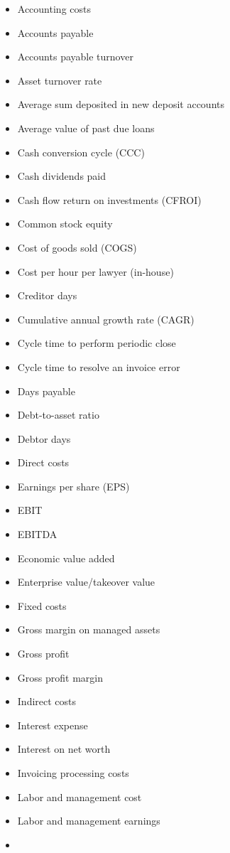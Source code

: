 \documentclass[]{book}
\providecommand{\tightlist}{%
  \setlength{\itemsep}{0pt}\setlength{\parskip}{0pt}}
\begin{document}
\begin{itemize}
\tightlist
\item
  Accounting costs
\item
  Accounts payable
\item
  Accounts payable turnover
\item
  Asset turnover rate
\item
  Average sum deposited in new deposit accounts
\item
  Average value of past due loans
\item
  Cash conversion cycle (CCC)
\item
  Cash dividends paid
\item
  Cash flow return on investments (CFROI)
\item
  Common stock equity
\item
  Cost of goods sold (COGS)
\item
  Cost per hour per lawyer (in-house)
\item
  Creditor days
\item
  Cumulative annual growth rate (CAGR)
\item
  Cycle time to perform periodic close
\item
  Cycle time to resolve an invoice error
\item
  Days payable
\item
  Debt-to-asset ratio
\item
  Debtor days
\item
  Direct costs
\item
  Earnings per share (EPS)
\item
  EBIT
\item
  EBITDA
\item
  Economic value added
\item
  Enterprise value/takeover value
\item
  Fixed costs
\item
  Gross margin on managed assets
\item
  Gross profit
\item
  Gross profit margin
\item
  Indirect costs
\item
  Interest expense
\item
  Interest on net worth
\item
  Invoicing processing costs
\item
  Labor and management cost
\item
  Labor and management earnings
\item

\end{itemize}
\end{document}
